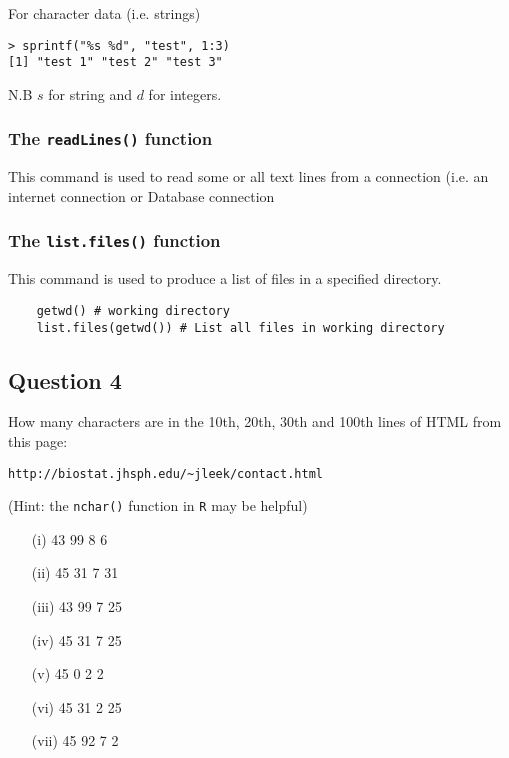 \documentclass[12pt]{article}
\begin{document}
\noindent For character data (i.e. strings) 
\begin{verbatim}
> sprintf("%s %d", "test", 1:3)
[1] "test 1" "test 2" "test 3"
\end{verbatim}
N.B $s$ for string and $d$ for integers.
\newpage
\subsubsection*{The \texttt{readLines()} function}

This command is used to read some or all text lines from a connection (i.e.
an internet connection or Database connection
\subsubsection*{The \texttt{list.files()} function}
This command is used to produce a list of files in a specified directory.
\begin{framed}
	\begin{verbatim}
	getwd() # working directory
	list.files(getwd()) # List all files in working directory
	\end{verbatim}
\end{framed}
\newpage
\subsection*{Question 4}
How many characters are in the 10th, 20th, 30th and 100th lines of HTML from this page: 
\begin{verbatim}
http://biostat.jhsph.edu/~jleek/contact.html 
\end{verbatim}
(Hint: the \texttt{nchar()} function in \texttt{R} may be helpful)
\begin{itemize}
\item[(i)] 43 99 8 6
\item[(ii)] 45 31 7 31
\item[(iii)] 43 99 7 25
\item[(iv)] 45 31 7 25
\item[(v)] 45 0 2 2
\item[(vi)] 45 31 2 25
\item[(vii)] 45 92 7 2
\end{itemize}

\newpage
\end{document}
